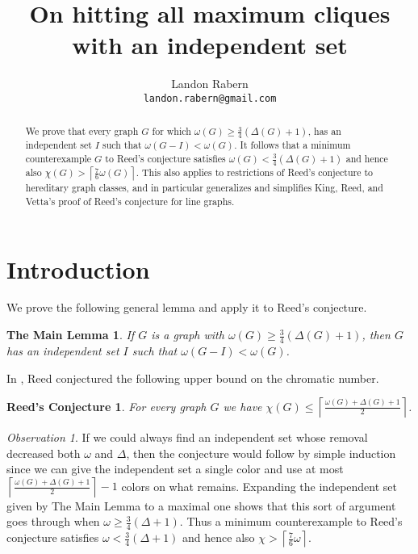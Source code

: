 \documentclass[12pt]{article}
\title{On hitting all maximum cliques with an independent set}
\author{Landon Rabern\\
\small \texttt{landon.rabern@gmail.com}}
\theoremstyle{plain}
\newtheorem*{MainLemma}{The Main Lemma}
\newtheorem*{ReedConjecture}{Reed's Conjecture}
\theoremstyle{definition}
\theoremstyle{remark}
\newtheorem*{observation}{Observation}
\begin{document}
\maketitle

\begin{abstract}
We prove that every graph $G$ for which $\omega(G) \geq \frac{3}{4}(\Delta(G) + 1)$, has an independent set $I$ such that $\omega(G - I) < \omega(G)$.  It follows that a minimum counterexample $G$ to Reed's conjecture satisfies $\omega(G) < \frac{3}{4}(\Delta(G) + 1)$ and hence also $\chi(G) > \left\lceil \frac{7}{6}\omega(G) \right\rceil$.  This also applies to restrictions of Reed's conjecture to hereditary graph classes, and in particular generalizes and simplifies King, Reed, and Vetta's proof of Reed's conjecture for line graphs.
\end{abstract}

\section{Introduction}
We prove the following general lemma and apply it to Reed's conjecture.

\begin{MainLemma}
If $G$ is a graph with $\omega(G) \geq \frac{3}{4}(\Delta(G) + 1)$, then $G$ has an independent set $I$ such that $\omega(G - I) < \omega(G)$.
\end{MainLemma}

In \cite{Reed}, Reed conjectured the following upper bound on the chromatic number.

\begin{ReedConjecture}
For every graph $G$ we have $\chi(G) \leq \left\lceil \frac{\omega(G) + \Delta(G) + 1}{2}\right\rceil$.
\end{ReedConjecture}

\begin{observation}
If we could always find an independent set whose removal decreased both $\omega$ and $\Delta$, then the conjecture would follow by simple induction since we can give the independent set a single color and use at most $\left\lceil \frac{\omega(G) + \Delta(G) + 1}{2}\right\rceil - 1$ colors on what remains.  Expanding the independent set given by The Main Lemma to a maximal one shows that this sort of argument goes through when $\omega \geq \frac{3}{4}(\Delta + 1)$.
Thus a minimum counterexample to Reed's conjecture satisfies $\omega < \frac{3}{4}(\Delta + 1)$ and hence also $\chi > \left\lceil \frac{7}{6}\omega \right\rceil$.\\
\end{observation}
\end{document}
